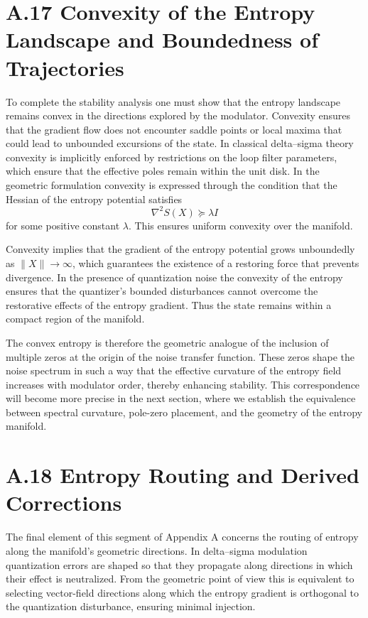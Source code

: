 \section{A.17 Convexity of the Entropy Landscape and Boundedness of Trajectories}

To complete the stability analysis one must show that the entropy landscape remains convex in the directions explored by the modulator. Convexity ensures that the gradient flow does not encounter saddle points or local maxima that could lead to unbounded excursions of the state. In classical delta–sigma theory convexity is implicitly enforced by restrictions on the loop filter parameters, which ensure that the effective poles remain within the unit disk. In the geometric formulation convexity is expressed through the condition that the Hessian of the entropy potential satisfies
\[
\nabla^2 S(X) \succeq \lambda I
\]
for some positive constant \(\lambda\). This ensures uniform convexity over the manifold.

Convexity implies that the gradient of the entropy potential grows unboundedly as \(\|X\|\to \infty\), which guarantees the existence of a restoring force that prevents divergence. In the presence of quantization noise the convexity of the entropy ensures that the quantizer’s bounded disturbances cannot overcome the restorative effects of the entropy gradient. Thus the state remains within a compact region of the manifold.

The convex entropy is therefore the geometric analogue of the inclusion of multiple zeros at the origin of the noise transfer function. These zeros shape the noise spectrum in such a way that the effective curvature of the entropy field increases with modulator order, thereby enhancing stability. This correspondence will become more precise in the next section, where we establish the equivalence between spectral curvature, pole-zero placement, and the geometry of the entropy manifold.

\section{A.18 Entropy Routing and Derived Corrections}

The final element of this segment of Appendix A concerns the routing of entropy along the manifold’s geometric directions. In delta–sigma modulation quantization errors are shaped so that they propagate along directions in which their effect is neutralized. From the geometric point of view this is equivalent to selecting vector-field directions along which the entropy gradient is orthogonal to the quantization disturbance, ensuring minimal injection.

